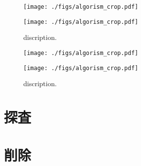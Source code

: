 \begin{figure}[h]
\begin{center}
  \texttt{[image: ./figs/algorism\_crop.pdf]}
\end{center}
\end{figure}

\begin{center}
  \begin{figure}[h]
    \texttt{[image: ./figs/algorism\_crop.pdf]}
    \caption{
      discription.
    }
    \label{fig_IpCHashT_XXXX}
  \end{figure}
\end{center}

\begin{figure}[h]
\begin{center}
  \texttt{[image: ./figs/algorism\_crop.pdf]}
\end{center}
\end{figure}
\begin{center}
  \begin{figure}[h]
    \texttt{[image: ./figs/algorism\_crop.pdf]}
    \caption{
      discription.
    }
    \label{fig_IpCHashT_XXXX}
  \end{figure}
\end{center}


\section{探査}
\section{削除}










